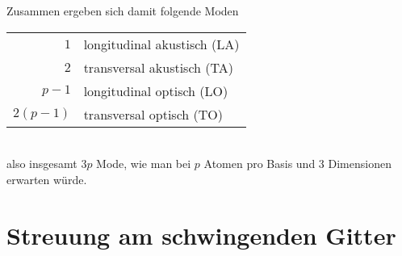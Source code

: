 Zusammen ergeben sich damit folgende Moden \\
\begin{tabular}{rl}
$1$ & longitudinal akustisch (LA)\\
$2$ & transversal akustisch (TA) \\
$p-1$ & longitudinal optisch (LO) \\
$2(p-1)$ & transversal optisch (TO) \\
\end{tabular} \\
also insgesamt $3p$ Mode, wie man bei $p$ Atomen pro Basis und 3 Dimensionen erwarten würde.






\section{Streuung am schwingenden Gitter}

